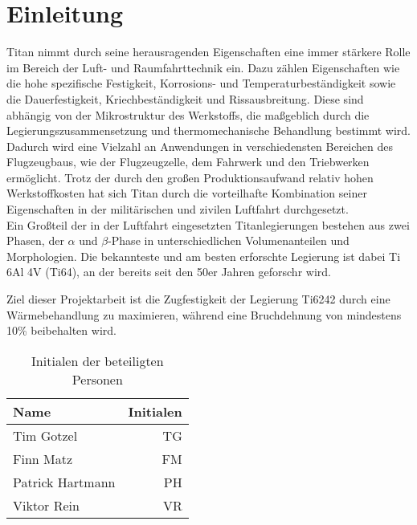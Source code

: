\chapter{Einleitung} 
Titan nimmt durch seine herausragenden Eigenschaften eine immer stärkere Rolle im Bereich der Luft- und Raumfahrttechnik ein. Dazu zählen Eigenschaften wie die hohe spezifische Festigkeit, Korrosions- und Temperaturbeständigkeit sowie die Dauerfestigkeit, Kriechbeständigkeit und Rissausbreitung. Diese sind abhängig von der Mikrostruktur des Werkstoffs, die maßgeblich durch die Legierungszusammensetzung und thermomechanische Behandlung bestimmt wird. Dadurch wird eine Vielzahl an Anwendungen in verschiedensten Bereichen des Flugzeugbaus, wie der Flugzeugzelle, dem Fahrwerk und den Triebwerken ermöglicht. Trotz der durch den großen Produktionsaufwand relativ hohen Werkstoffkosten hat sich Titan durch die vorteilhafte Kombination seiner Eigenschaften in der militärischen und zivilen Luftfahrt durchgesetzt. \\ 

Ein Großteil der in der Luftfahrt eingesetzten Titanlegierungen bestehen aus zwei Phasen, der $\alpha$ und $\beta$-Phase in unterschiedlichen Volumenanteilen und Morphologien. Die bekannteste und am besten erforschte Legierung ist dabei Ti 6Al 4V (Ti64), an der bereits seit den 50er Jahren 
geforschr wird. 

Ziel dieser Projektarbeit ist die Zugfestigkeit der Legierung Ti6242 durch eine Wärmebehandlung zu maximieren, während eine Bruchdehnung von mindestens 10\% beibehalten wird.  

\begin{table}[h] 
	\centering 
	\begin{tabular}{lr} 
		
		Name & \hspace{0.5cm} Initialen\\ 
		\hline 
		Tim Gotzel & TG\\ 
		Finn Matz & FM\\ 
		Patrick Hartmann & PH \\ 
		Viktor Rein & VR\\ 
		\hline 
		
	\end{tabular} 
	\caption{Initialen der beteiligten Personen} 
	\label{tab:initialien} 
\end{table} 
